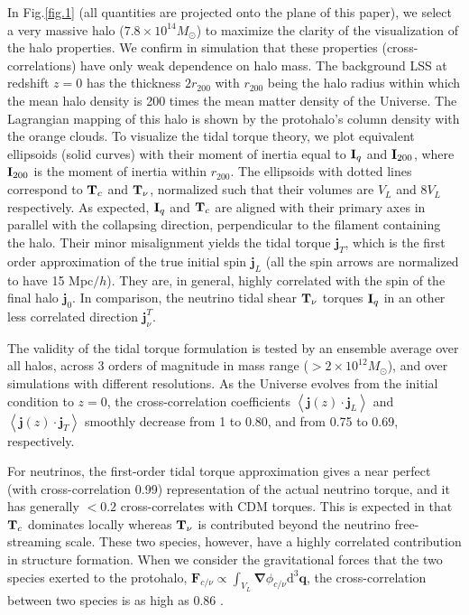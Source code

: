 \documentclass[aps,prd,twocolumn,amsmath,amssymb,amsfont,superscriptaddress,nofootinbib]{revtex4-1}
\newcommand{\bs}{\boldsymbol}
\newcommand{\diff}{{\mathrm d}}
\newcommand{\T}{\bold{T}}
\newcommand{\I}{\bold{I}}
\newcommand{\spin}{\bs{j}}
\begin{document}
In Fig.\ref{fig.1} (all quantities are projected onto the plane of this paper), 
we select a very massive halo ($7.8\times 10^{14}M_\odot$) to maximize the clarity of the visualization of the halo properties.
We confirm in simulation that these properties (cross-correlations) have only weak dependence on halo mass. 
The background LSS at redshift $z=0$ has the thickness $2r_{200}$ with $r_{200}$ being the halo radius within which the mean halo density is 200 times the mean matter density of the Universe.
The Lagrangian mapping of this halo is shown by the protohalo's column density with the orange clouds.
To visualize the tidal torque theory, we plot equivalent ellipsoids (solid curves) with their moment of inertia equal to $\I_q$ and 
$\I_{200}$, where $\I_{200}$ is the moment of inertia within $r_{200}$. 
The ellipsoids with dotted lines correspond to $\T_c$ and $\T_\nu$, normalized such that their volumes are $V_L$ and $8V_L$ respectively. 
As expected, $\I_q$ and $\T_c$ are aligned with their primary axes in parallel with the collapsing direction,  perpendicular to the filament containing the halo. 
Their minor misalignment yields the tidal torque $\spin_T$, which is the first order approximation of the true initial spin $\spin_L$ (all the spin arrows are normalized to have 15 Mpc$/h$). 
They are, in general, highly correlated with the spin of the final halo $\spin_0$.
In comparison, the neutrino tidal shear $\T_\nu$ torques $\I_q$ in an other less correlated direction $\spin^T_\nu$.

The validity of the tidal torque formulation is tested by an ensemble average over all halos, 
across 3 orders of magnitude in mass range ($>2\times10^{12}M_\odot$), and over simulations with different resolutions.
As the Universe evolves from the initial condition to $z=0$, the cross-correlation coefficients $\left\langle \spin(z) \cdot \spin_L \right\rangle$ and
$\left\langle \spin(z) \cdot \spin_T \right\rangle$ smoothly decrease from 1 to 0.80, and
from 0.75 to 0.69, respectively.

For neutrinos, the first-order tidal torque approximation gives a near perfect (with cross-correlation 0.99) representation of the actual neutrino torque, and it has generally $<0.2$ cross-correlates with CDM torques. This is expected in that $\T_c$ dominates locally  whereas $\T_\nu$ is contributed beyond the neutrino free-streaming scale. These two species, however, have a highly correlated contribution in structure formation. When we consider the gravitational forces that the two species exerted to the protohalo, $\bs{F}_{c/\nu}\propto\int_{V_L}\bs{\nabla}\phi_{c/\nu}\diff^3\bs{q}$, the cross-correlation between two species is as high as 0.86 .
\end{document}
